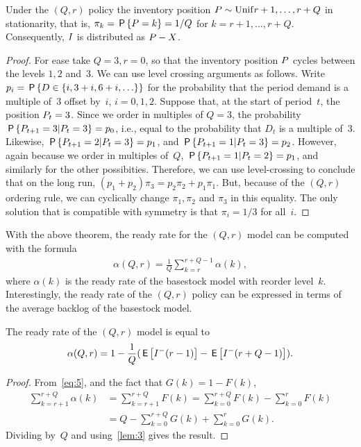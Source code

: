 \documentclass[stochastic-or.tex]{subfiles}
\begin{document}
\begin{theorem}\label{thr:3}
Under the $(Q,r)$ policy the inventory position $\IP \sim \Unif{r+1, \ldots, r+Q}$ in stationarity,  that is, $\pi_{k} = \P{\IP = k} = 1/Q$ for $k=r+1, \ldots, r+Q$. Consequently, $\IL$ is distributed as $\IP-X$.
\end{theorem}
\begin{proof}
For ease take $Q=3, r=0$, so that the inventory position $\IP$ cycles between the levels $1, 2$ and~$3$.
We can use level crossing arguments as follows.
Write $p_{i} = \P{D\in \{i, 3+i, 6+i, \ldots\}}$ for the probability that the period demand is a multiple of~$3$ offset by~$i$, $i=0, 1, 2$.
Suppose that, at the start of period~$t$, the position $\IP_{t} = 3$.
Since we order in multiples of $Q=3$, the probability $\P{\IP_{t+1} =3|\IP_{t}=3} = p_{0}$, i.e., equal to the probability that $D_{t}$ is a multiple of~$3$.
Likewise, $\P{\IP_{t+1} = 2|\IP_t=3} = p_{1}$, and $\P{\IP_{t+1} = 1|\IP_t=3} = p_{2}$.
However, again because we order in multiples of~$Q$, $\P{\IP_{t+1} = 1|\IP_t=2} = p_{1}$, and similarly for the other possibities.
Therefore, we can use level-crossing to conclude that on the long run, $(p_{1}+p_2)\pi_{3} = p_2\pi_{2} + p_1 \pi_{1}$.
But, because of the $(Q,r)$ ordering rule, we can cyclically change $\pi_{1}, \pi_{2}$ and $\pi_{3}$ in this equality.
The only solution that is compatible with symmetry is that $\pi_{i} = 1/3$ for all~$i$.
\end{proof}

With the above theorem, the ready rate for the $(Q,r)$ model can be computed with the formula
\begin{align}
   \alpha(Q,r) = \frac1Q \sum_{k=r}^{r+Q-1} \alpha(k), %
\end{align}
where $\alpha(k)$ is the ready rate  of the basestock model with reorder level~$k$. Interestingly, the ready rate of the $(Q,r)$ policy can be expressed in terms of the
average backlog of the basestock model.

\begin{lemma}
The ready rate of the $(Q,r)$ model is equal to
\begin{align}
   \alpha(Q,r) = 1 - \frac1Q(\E{I^{-}(r-1)} - \E{I^{-}(r+Q-1)}).
\end{align}
\end{lemma}
\begin{proof}
From~\cref{eq:5}, and the fact that $G(k) = 1- F(k)$,
\begin{align*}
\sum_{k=r+1}^{r+Q} \alpha(k)
  &=  \sum_{k=r+1}^{r+Q} F(k)
  =  \sum_{k=0}^{r+Q} F(k)  -  \sum_{k=0}^{r} F(k) \\
  &= Q - \sum_{k=0}^{r+Q} G(k)  +  \sum_{k=0}^{r} G(k).
\end{align*}
Dividing by~$Q$ and using~\cref{lem:3} gives the result.
\end{proof}
\end{document}
